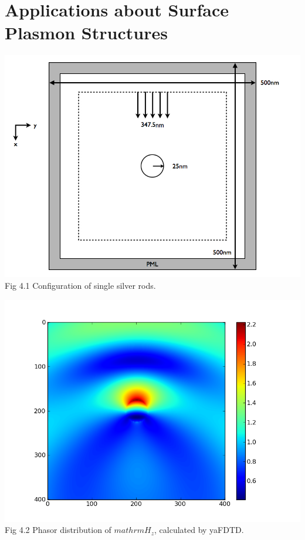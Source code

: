\documentclass[openany]{book}
\begin{document}
\chapter{Applications about Surface Plasmon Structures}


\clearpage
\begin{center}
\includegraphics[scale=0.5]{images/single-rod-config.jpg}\\
Fig 4.1
Configuration of single silver rods.
\end{center}
\begin{center}
\includegraphics[scale=0.8]{images/phasor-exam-fdtd.png}\\
Fig 4.2
Phasor distribution of $mathrm{H_z}$, calculated by yaFDTD.
\end{center}
\end{document}
